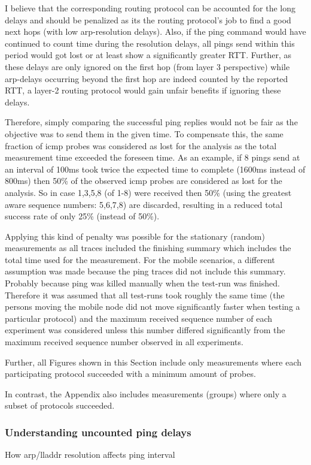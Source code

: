 \documentclass[a4paper,12pt,twoside]{article}
\begin{document}
I believe that the corresponding routing protocol can be accounted
for the long delays and should be penalized as its the routing
protocol's job to find a good next hops (with low arp-resolution
delays). Also, if the ping command would have continued to count time
during the resolution delays, all pings send within this period would
got lost or at least show a significantly greater RTT. Further, as
these delays are only ignored on the first hop (from layer 3
perspective) while arp-delays occurring beyond the first hop are indeed
counted by the reported RTT, a layer-2 routing protocol would gain
unfair benefits if ignoring these delays.


Therefore, simply comparing the successful ping replies would not be
fair as the objective was to send them in the given time.  To
compensate this, the same fraction of icmp probes was considered as
lost for the analysis as the total measurement time exceeded the
foreseen time. As an example, if 8 pings send at an interval of 100ms
took twice the expected time to complete (1600ms instead of 800ms)
then 50\% of the observed icmp probes are considered as lost for the
analysis.  So in case 1,3,5,8 (of 1-8) were received then 50\% (using
the greatest aware sequence numbers: 5,6,7,8) are discarded, resulting
in a reduced total success rate of only 25\% (instead of 50\%).

Applying this kind of penalty was possible for the stationary (random)
measurements as all traces included the finishing summary which includes
the total time used for the measurement.
For the mobile scenarios, a different assumption was made because the ping
traces did not include this summary. Probably because ping was killed manually
when the test-run was finished. Therefore it was assumed that all test-runs
took roughly the same time (the persons moving the mobile node did not move
significantly faster when testing a particular protocol) and the maximum 
received sequence number of each experiment was considered unless this 
number differed significantly from the maximum received sequence number 
observed in all experiments.

Further, all Figures shown in this Section include only measurements where
each participating protocol succeeded with a minimum amount of probes.

In contrast, the Appendix also includes measurements (groups) where only
a subset of protocols succeeded.



\subsubsection{Understanding uncounted ping delays}
\label{arp-resolution}
How arp/lladdr resolution affects ping interval
\end{document}
